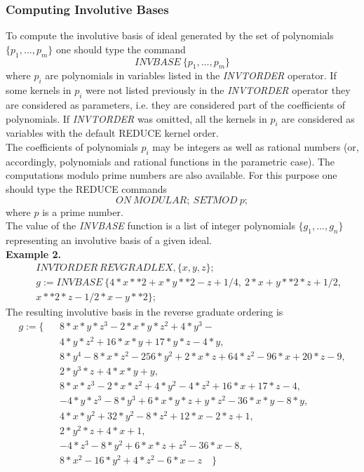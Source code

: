 \subsubsection{Computing Involutive Bases}
To compute the involutive basis of ideal generated by the set of
polynomials $\{p_1,...,p_m\}$ one should type the command
\[ INVBASE \> \{p_1,...,p_m\} \]
where $p_i$ are polynomials in variables listed in the
\emph{INVTORDER} operator. If some kernels in $p_i$ were not listed
previously in the \emph{INVTORDER} operator they are considered as
parameters, i.e. they are considered part of the coefficients of
polynomials. If \emph{INVTORDER} was omitted, all the kernels
in $p_i$ are considered as variables with the default REDUCE
kernel order.\\
The coefficients of polynomials $p_i$ may be integers as well as
rational numbers (or, accordingly, polynomials and rational functions
in the parametric case). The computations modulo prime numbers are
also available. For this purpose one should type the REDUCE commands
\[ ON \> MODULAR;\> SETMOD \> p; \]
where $p$ is a prime number.\\
The value of the \emph{INVBASE} function is a list of integer polynomials
$\{g_1,...,g_n\}$ representing an involutive basis of a given ideal.\\
\noindent
\textbf{Example 2.}
\begin{eqnarray*}
& & INVTORDER \> REVGRADLEX,\{x,y,z\}; \\
& & g:= INVBASE \> \{4*x**2 + x*y**2 - z + 1/4,\>
                     2*x + y**2*z + 1/2,\> \\
& &    x**2*z - 1/2*x - y**2 \};
\end{eqnarray*}
The resulting involutive basis in the reverse graduate ordering is
\begin{eqnarray*}
g := \{& & 8*x*y*z^3  - 2*x*y*z^2  + 4*y^3  - \\
& &  4*y*z^2 + 16*x*y + 17*y*z - 4*y,\\
& &  8*y^4  - 8*x*z^2  - 256*y^2  + 2*x*z + 64*z^2  - 96*x + 20*z - 9,\\
& &  2*y^3*z + 4*x*y + y,\\
& &  8*x*z^3  - 2*x*z^2  + 4*y^2  - 4*z^2 + 16*x + 17*z - 4,\\
& & - 4*y*z^3  - 8*y^3  + 6*x*y*z + y*z^2  - 36*x*y - 8*y,\\
& &  4*x*y^2  + 32*y^2  - 8*z^2  + 12*x - 2*z + 1,\\
& &  2*y^2*z + 4*x + 1,\\
& & - 4*z^3  - 8*y^2  + 6*x*z + z^2  - 36*x - 8,\\
& &  8*x^2  - 16*y^2  + 4*z^2  - 6*x - z \quad \}
\end{eqnarray*}
